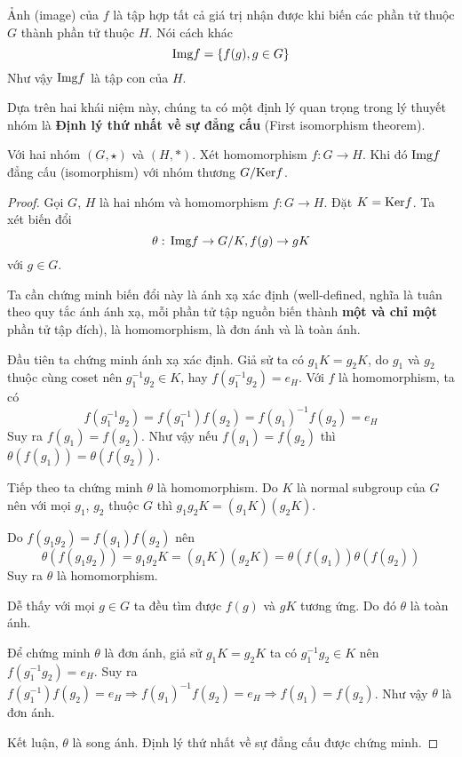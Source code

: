\begin{definition}[Image]
    Ảnh (image) của $f$ là tập hợp tất cả giá trị nhận được khi biến các phần
    tử thuộc $G$ thành phần tử thuộc $H$. Nói cách khác
    \begin{equation}
        \text{Img} f = \{ f(g), g \in G \}
    \end{equation}
    Như vậy $\text{Img} f$ là tập con của $H$.
\end{definition}

Dựa trên hai khái niệm này, chúng ta có một định lý quan trọng trong lý
thuyết nhóm là \textbf{Định lý thứ nhất về sự đẳng cấu} (First isomorphism theorem).

\begin{theorem}
    Với hai nhóm $(G, \star)$ và $(H, *)$. Xét homomorphism $f: G \to H$. Khi 
    đó $\text{Img} f$ đẳng cấu (isomorphism) với nhóm thương $G / \text{Ker} f$.
\end{theorem}

\begin{proof}
    Gọi $G$, $H$ là hai nhóm và homomorphism $f: G \to H$.
    Đặt $K = \text{Ker} f$. Ta xét biến đổi
    \[\theta:\,\text{Img} f \to G / K, f(g) \to g K \]
    với $g \in G$.

    Ta cần chứng minh biến đổi này là ánh xạ xác định (well-defined, nghĩa là 
    tuân theo quy tắc ánh ánh xạ, mỗi phần tử tập nguồn biến thành \textbf{một và chỉ một}
    phần tử tập đích), là homomorphism, là đơn ánh và là toàn ánh.

    Đầu tiên ta chứng minh ánh xạ xác định. Giả sử ta có $g_1 K = g_2 K$, do $g_1$ và
    $g_2$ thuộc cùng coset nên $g_1^{-1} g_2 \in K$, hay $f(g_1^{-1} g_2) = e_H$.
    Với $f$ là homomorphism, ta có 
    \[f(g_1^{-1} g_2) = f(g_1^{-1}) f(g_2) =
    f(g_1)^{-1} f(g_2) = e_H\]
    Suy ra $f(g_1) = f(g_2)$. Như vậy nếu $f(g_1) = f(g_2)$
    thì $\theta (f(g_1)) = \theta (f(g_2))$.

    Tiếp theo ta chứng minh $\theta$ là homomorphism. Do $K$ là normal subgroup của
    $G$ nên với mọi $g_1$, $g_2$ thuộc $G$ thì $g_1 g_2 K = (g_1 K) (g_2 K)$.

    Do $f(g_1 g_2) = f(g_1) f(g_2)$ nên 
    \[ \theta (f(g_1 g_2)) = g_1 g_2 K = (g_1 K) (g_2 K) = \theta (f(g_1)) 
    \theta (f(g_2)) \]
    Suy ra $\theta$ là homomorphism.

    Dễ thấy với mọi $g \in G$ ta đều tìm được $f(g)$ và $g K$ tương ứng. Do đó $\theta$
    là toàn ánh.

    Để chứng minh $\theta$ là đơn ánh, giả sử $g_1 K = g_2 K$ ta có $g_1^{-1} g_2 \in K$
    nên $f(g_1^{-1} g_2) = e_H$. Suy ra $f(g_1^{-1}) f(g_2) = e_H \Rightarrow 
    f(g_1)^{-1} f(g_2) = e_H \Rightarrow f(g_1) = f(g_2)$. Như vậy $\theta$ là đơn ánh.

    Kết luận, $\theta$ là song ánh. Định lý thứ nhất về sự đẳng cấu được chứng minh.
\end{proof}